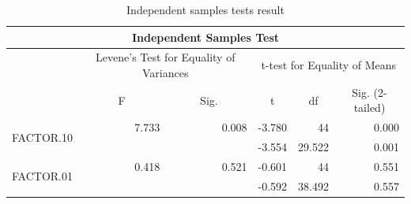 \documentclass[a4paper]{article}
\begin{document}
\begin{table}[H]
\centering
\caption{Independent samples tests result}
\label{tab:location1}
\begin{tabular}{|l|c|c|r|r|r|} 
\hline
\multicolumn{6}{|c|}{Independent Samples Test}                                                                                                                                                                                          \\ 
\hline
                           & \multicolumn{2}{c|}{Levene's Test for Equality of Variances} & \multicolumn{3}{c|}{t-test for Equality of Means}                                                                                           \\ 
\hline
                           & \multirow{2}{*}{F}         & \multirow{2}{*}{Sig.}           & \multicolumn{1}{c|}{\multirow{2}{*}{t}} & \multicolumn{1}{c|}{\multirow{2}{*}{df}} & \multicolumn{1}{c|}{\multirow{2}{*}{Sig. (2-tailed)}}  \\ 
\cline{1-1}
                           &                            &                                 & \multicolumn{1}{c|}{}                   & \multicolumn{1}{c|}{}                    & \multicolumn{1}{c|}{}                                  \\ 
\hline
\multirow{2}{*}{FACTOR.10} & \multicolumn{1}{r|}{7.733} & \multicolumn{1}{r|}{0.008}      & -3.780                                  & 44                                       & 0.000                                                  \\ 
\cline{2-6}
                           & \multicolumn{1}{l|}{~}     & \multicolumn{1}{l|}{~}          & -3.554                                  & 29.522                                   & 0.001                                                  \\ 
\hline
\multirow{2}{*}{FACTOR.01} & \multicolumn{1}{r|}{0.418} & \multicolumn{1}{r|}{0.521}      & -0.601                                  & 44                                       & 0.551                                                  \\ 
\cline{2-6}
                           & \multicolumn{1}{l|}{~}     & \multicolumn{1}{l|}{~}          & -0.592                                  & 38.492                                   & 0.557                                                  \\
\hline
\end{tabular}
\end{table}
\end{document}

